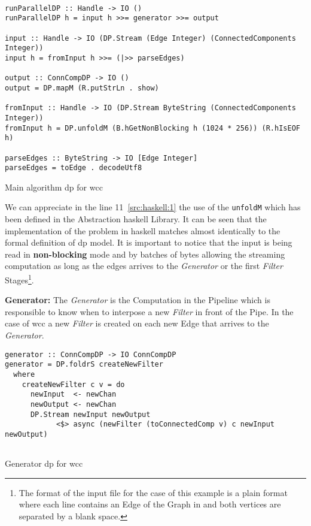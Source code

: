 \documentclass[12pt]{article}
\begin{document}
\begin{listing}[H]
\begin{verbatim}

runParallelDP :: Handle -> IO ()
runParallelDP h = input h >>= generator >>= output

input :: Handle -> IO (DP.Stream (Edge Integer) (ConnectedComponents Integer))
input h = fromInput h >>= (|>> parseEdges)

output :: ConnCompDP -> IO ()
output = DP.mapM (R.putStrLn . show)

fromInput :: Handle -> IO (DP.Stream ByteString (ConnectedComponents Integer))
fromInput h = DP.unfoldM (B.hGetNonBlocking h (1024 * 256)) (R.hIsEOF h)

parseEdges :: ByteString -> IO [Edge Integer]
parseEdges = toEdge . decodeUtf8

\end{verbatim}
\caption{Main algorithm \acrshort{dp} for \acrshort{wcc}}
\label{src:haskell:1}
\end{listing}

We can appreciate in the line 11~\ref{src:haskell:1} the use of the \texttt{unfoldM} which has been defined in the Abstraction \acrshort{haskell} Library.
It can be seen that the implementation of the problem in \acrshort{haskell} matches almost identically to the formal definition of \acrshort{dp} model.
It is important to notice that the input is being read in \textbf{non-blocking} mode and by batches of bytes allowing the streaming computation as long as the edges arrives to the 
\textit{Generator} or the first \textit{Filter} Stages\footnote{The format of the input file for the case of this example is a plain format where each line contains an Edge of the Graph in and both vertices are separated by a blank space.}.

\textbf{Generator:}
The \textit{Generator} is the Computation in the Pipeline which is responsible to know when to interpose a new \textit{Filter} in front of the Pipe.
In the case of \acrshort{wcc} a new \textit{Filter} is created on each new Edge that arrives to the \textit{Generator}.

\begin{listing}[H]
\begin{verbatim}
generator :: ConnCompDP -> IO ConnCompDP
generator = DP.foldrS createNewFilter
  where
    createNewFilter c v = do
      newInput  <- newChan
      newOutput <- newChan
      DP.Stream newInput newOutput 
            <$> async (newFilter (toConnectedComp v) c newInput newOutput)
  
  \end{verbatim}
  \caption{Generator \acrshort{dp} for \acrshort{wcc}}
  \label{src:haskell:2}
\end{listing}
\end{document}
